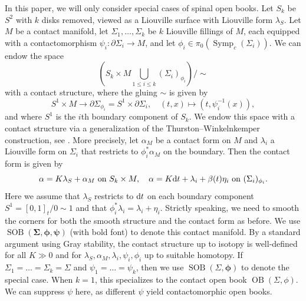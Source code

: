 \documentclass[11pt]{amsart}
\numberwithin{equation}{section}
\def\rd{{\rm d}}
\DeclareMathOperator{\symp}{Symp}
\DeclareMathOperator{\OB}{OB}
\DeclareMathOperator{\SOB}{SOB}
\begin{document}
In this paper, we will only consider special cases of spinal open books. Let $S_{k}$ be $S^2$ with $k$ disks removed, viewed as a Liouville surface with Liouville form $\lambda_S$. Let $M$ be a contact manifold, let $\Sigma_1,\ldots,\Sigma_{k}$ be $k$ Liouville fillings of $M$, each equipped with a contactomorphism $\psi_i:\partial \Sigma_i\to M$, and let $\phi_i\in \pi_0(\symp_c(\Sigma_i))$. We can endow the space
$$\left(S_{k}\times M \displaystyle \bigcup_{1\le i \le k}(\Sigma_i)_{\phi_i}\right)/\sim$$
with a contact structure, where the gluing $\sim$ is given by 
$$S^1\times M \to \partial \Sigma_{\phi_i}=S^1\times \partial \Sigma_i, \quad (t,x)\mapsto (t,\psi_i^{-1}(x)),$$
and where $S^1$ is the $i$th boundary component of $S_k$. We endow this space with a contact structure via a generalization of the Thurston--Winkelnkemper construction, see \cite[\S 2.3]{lisi2018symplectic}. More precisely, let $\alpha_M$ be a contact form on $M$ and $\lambda_i$ a Liouville form on $\Sigma_i$ that restricts to $\phi_i^*\alpha_M$ on the boundary. Then the contact form is given by 
\begin{equation}\label{eqn:TW}
    \alpha = K\lambda_S+\alpha_M \text{ on } S_{k}\times M, \quad \alpha = K\rd t + \lambda_{i}+\beta(t)\eta_{i} \text{ on } (\Sigma_i)_{\phi_i}.
\end{equation}
Here we assume that $\lambda_S$ restricts to $\rd t$ on each boundary component $S^1=[0,1]_t/0\sim1$ and that $\phi_i^*\lambda_i=\lambda_i+\eta_i$. Strictly speaking, we need to smooth the corners for both the smooth structure and the contact form as before. We use $\SOB(\bm{\Sigma},\bm{\phi},\bm{\psi})$ (with bold font) to denote this contact manifold. By a standard argument using Gray stability, the contact structure up to isotopy is well-defined for all $K\gg 0$ and for $\lambda_S,\alpha_M,\lambda_i,\psi_i,\phi_i$ up to suitable homotopy. If $\Sigma_1=\ldots=\Sigma_k=\Sigma$ and $\psi_1=\ldots=\psi_k$, then we use $\SOB(\Sigma,\bm{\phi})$ to denote the special case. When $k=1$, this specializes to the contact open book $\OB(\Sigma,\phi)$. We can suppress $\psi$ here, as different $\psi$ yield contactomorphic open books.
\end{document}
